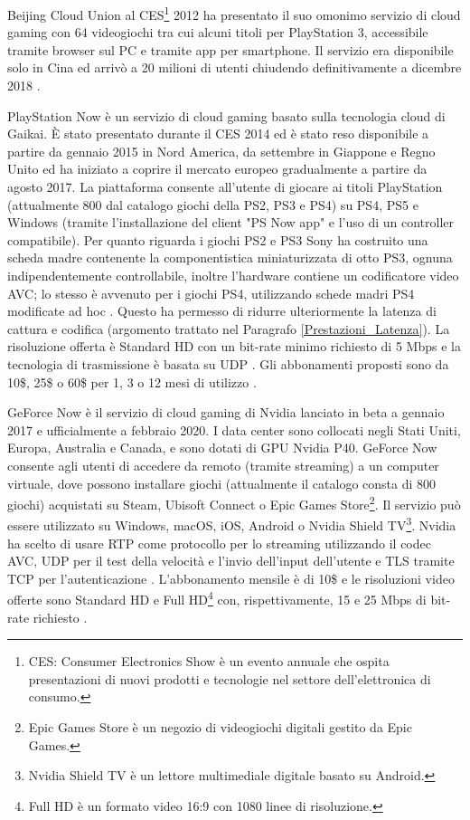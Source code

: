 Beijing Cloud Union al CES\footnote{CES: Consumer Electronics Show è un evento annuale che ospita presentazioni di nuovi prodotti e tecnologie nel settore dell'elettronica di consumo.} 2012 ha presentato il suo omonimo servizio di cloud gaming con 64 videogiochi tra cui alcuni titoli per PlayStation 3, accessibile tramite browser sul PC e tramite app per smartphone. Il servizio era disponibile solo in Cina ed arrivò a 20 milioni di utenti chiudendo definitivamente a dicembre 2018 \parencite{CloudUnion}.

PlayStation Now è un servizio di cloud gaming basato sulla tecnologia cloud di Gaikai. È stato presentato durante il CES 2014 ed è stato reso disponibile a partire da gennaio 2015 in Nord America, da settembre in Giappone e Regno Unito ed ha iniziato a coprire il mercato europeo gradualmente a partire da agosto 2017. La piattaforma consente all'utente di giocare ai titoli PlayStation (attualmente 800 dal catalogo giochi della PS2, PS3 e PS4) su PS4, PS5 e Windows (tramite l'installazione del client "PS Now app" e l'uso di un controller compatibile). Per quanto riguarda i giochi PS2 e PS3 Sony ha costruito una scheda madre contenente la componentistica miniaturizzata di otto PS3, ognuna indipendentemente controllabile, inoltre l'hardware contiene un codificatore video AVC; lo stesso è avvenuto per i giochi PS4, utilizzando schede madri PS4 modificate ad hoc \parencite{PlayStation_Now_Chip}. Questo ha permesso di ridurre ulteriormente la latenza di cattura e codifica (argomento trattato nel Paragrafo \ref{Prestazioni_Latenza}). La risoluzione offerta è Standard HD con un bit-rate minimo richiesto di 5 Mbps e la tecnologia di trasmissione è basata su UDP \parencite{A_Network_Analysis_on_Cloud_Gaming_Stadia_GeForce_Now_and_PSNow}. Gli abbonamenti proposti sono da 10\$, 25\$ o 60\$ per 1, 3 o 12 mesi di utilizzo \parencite{PlayStation_Now}.

GeForce Now è il servizio di cloud gaming di Nvidia lanciato in beta a gennaio 2017 e ufficialmente a febbraio 2020. I data center sono collocati negli Stati Uniti, Europa, Australia e Canada, e sono dotati di GPU Nvidia P40. GeForce Now consente agli utenti di accedere da remoto (tramite streaming) a un computer virtuale, dove possono installare giochi (attualmente il catalogo consta di 800 giochi) acquistati su Steam, Ubisoft Connect o Epic Games Store\footnote{Epic Games Store è un negozio di videogiochi digitali gestito da Epic Games.}. Il servizio può essere utilizzato su Windows, macOS, iOS, Android o Nvidia Shield TV\footnote{Nvidia Shield TV è un lettore multimediale digitale basato su Android.}.
Nvidia ha scelto di usare RTP come protocollo per lo streaming utilizzando il codec AVC, UDP per il test della velocità e l'invio dell'input dell'utente e TLS tramite TCP per l'autenticazione \parencite{A_Network_Analysis_on_Cloud_Gaming_Stadia_GeForce_Now_and_PSNow}. L'abbonamento mensile è di 10\$ e le risoluzioni video offerte sono Standard HD e Full HD\footnote{Full HD è un formato video 16:9 con 1080 linee di risoluzione.} con, rispettivamente, 15 e 25 Mbps di bit-rate richiesto \parencite{GeForce_Now}.

